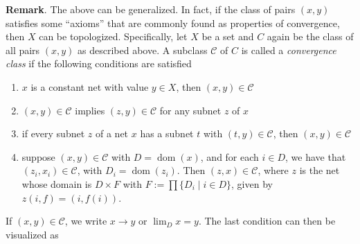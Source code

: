 \documentclass[12pt]{article}
\begin{document}
\textbf{Remark}.  The above can be generalized.  In fact, if the class of pairs $(x,y)$ satisfies some ``axioms'' that are commonly found as properties of convergence, then $X$ can be topologized.  Specifically, let $X$ be a set and $C$ again be the class of all pairs $(x,y)$ as described above.  A subclass $\mathcal{C}$ of $C$ is called a \emph{convergence class} if the following conditions are satisfied
\begin{enumerate}
\item $x$ is a constant net with value $y\in X$, then $(x,y)\in \mathcal{C}$
\item $(x,y)\in \mathcal{C}$ implies $(z,y)\in \mathcal{C}$ for any subnet $z$ of $x$
\item if every subnet $z$ of a net $x$ has a subnet $t$ with $(t,y)\in \mathcal{C}$, then $(x,y)\in \mathcal{C}$
\item suppose $(x,y)\in \mathcal{C}$ with $D=\operatorname{dom}(x)$, and for each $i\in D$, we have that $(z_i,x_i)\in \mathcal{C}$, with $D_i=\operatorname{dom}(z_i)$.  Then $(z,x)\in \mathcal{C}$, where $z$ is the net whose domain is $D\times F$ with $F:=\prod \lbrace D_i \mid i\in D\rbrace$, given by $z(i,f)=(i,f(i))$.
\end{enumerate}
If $(x,y)\in \mathcal{C}$, we write $x\to y$ or $\lim_D x=y$.  The last condition can then be visualized as
\end{document}
